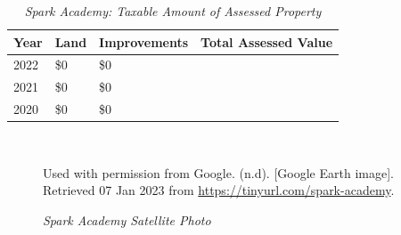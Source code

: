 \begin{table}[hbtp]
  \SingleSpacing%
  \caption[Spark Academy: Taxable Amount of Assessed Propery]{\textit{Spark Academy: Taxable Amount of Assessed Property}}%
  \label{tab:spark-academy-taxable-amount}
  \begin{tabular}{llll}
    \toprule
    Year & Land        & Improvements & Total Assessed Value \\
    \midrule
    2022 & \$0         & \$0          & \\
    2021 & \$0         & \$0          & \\
    2020 & \$0         & \$0          & \\
    \bottomrule
  \end{tabular}\\
\end{table}

\begin{figure}[hbtp]
  \caption[Spark Academy Satellite Photo] {\textit{Spark Academy Satellite Photo}}%
  \label{fig:spark-academy-sat-photo}
  {Used with permission from Google. (n.d). [Google Earth image]. Retrieved 07 Jan 2023 from \url{https://tinyurl.com/spark-academy}.}
\end{figure}


